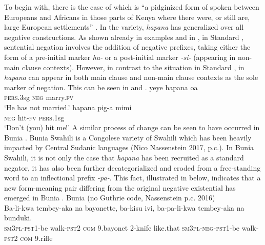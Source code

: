 \documentclass[output=paper]{langsci/langscibook}
\begin{document}
To begin with, there is the case of  which is ``a pidginized
form of  spoken between Europeans and Africans in those parts
of Kenya where there were, or still are, large European settlements''
\parencite[51]{Vitale1980}. In the  variety, \textit{hapana} has
generalized over all negative constructions. As shown already in examples
 and  in , in
Standard , sentential negation
involves the addition of negative prefixes, taking either the form of a
pre-initial marker \textit{ha-} or a post-initial marker \textit{-si-}
(appearing in non-main clause contexts). However, in contrast to the
situation in Standard , in  \textit{hapana} can
appear in both main clause and non-main clause contexts as the sole marker
of negation. This can be seen in  and
.
\ea\label{ex:kisetla-marry-hit}
\ea\label{ex:kisetla-marry}
\gll yeye hapana oa\\
	\textsc{pers}.3sg \textsc{neg} marry.\textsc{fv}\\
\glt 	`He has not married.'
\ex\label{ex:kisetla-hit}
\gll hapana pig-a mimi\\
	\textsc{neg} hit-\textsc{fv} \textsc{pers}.1sg\\
\glt 	`Don't (you) hit me!'
\z\z
A similar process of change can be seen to have occurred in
Bunia . Bunia Swahili is a
Congolese variety of Swahili which has been heavily impacted by Central
Sudanic languages (Nico Nassenstein 2017, p.c.). In Bunia Swahili, it is
not only the case that \textit{hapana} has been recruited as a standard
negator, it has also been further decategorialized and eroded from a
free-standing word to an inflectional prefix \textit{-pa-}. This fact,
illustrated in  below, indicates that a new form-meaning
pair differing from the original negative existential has emerged in
Bunia .
%
\ea\label{ex:bunia-arms}
Bunia  (no Guthrie code, Nassenstein p.c. 2016)\\
\gll Ba-li-kwa tembey-aka na bayonette, ba-kisu ivi, ba-pa-li-kwa tembey-aka na bunduki.\\
	\textsc{sm3pl}-\textsc{pst}1-be walk-\textsc{pst}2 \textsc{com} 9.bayonet 2-knife like.that \textsc{sm}3\textsc{pl}-\textsc{neg}-\textsc{pst}1-be walk-\textsc{pst}2 \textsc{com} 9.rifle\\
\end{document}
